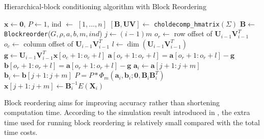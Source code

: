 \begin{algorithm}[!h]
    \caption{Hierarchical-block conditioning algorithm with Block Reordering}
    \begin{algorithmic}
            \State $\mathbf{x} \leftarrow \mathbf{0}$, $P \leftarrow 1$, ind $\leftarrow$ $[1,\dots, n]$
            \State $[\mathbf{B}, \mathbf{UV}] \leftarrow$ \texttt{choldecomp\_hmatrix}$(\Sigma)$
            \State $\mathbf{B} \leftarrow$ \texttt{Blockreorder}($G, \rho, a, b, m, ind$)
                \State $j \leftarrow (i-1)m$
                    \State $o_r \leftarrow$ row offset of $\mathbf{U}_{i-1}\mathbf{V}_{i-1}^T$
                    \State $o_c \leftarrow$ column offset of $\mathbf{U}_{i-1}\mathbf{V}_{i-1}^T$
                    \State $l \leftarrow \dim(\mathbf{U}_{i-1}\mathbf{V}_{i-1}^T)$
                    \State $\mathbf{g} \leftarrow \mathbf{U}_{i-1}\mathbf{V}_{i-1}^T\mathbf{x}[o_c+1:o_c+l]$
                    \State $\mathbf{a}[o_r+1:o_r+l] = \mathbf{a}[o_r+1:o_r+l] - \mathbf{g}$
                    \State $\mathbf{b}[o_r+1:o_r+l] = \mathbf{a}[o_r+1:o_r+l] - \mathbf{g}$
                \EndIf
                \State $\mathbf{a}_i \leftarrow \mathbf{a}[j+1:j+m]$
                \State $\mathbf{b}_i \leftarrow \mathbf{b}[j+1:j+m]$
                \State $P = P*\Phi_m(\mathbf{a}_i, \mathbf{b}_i; \mathbf{0}, \mathbf{B}_i\mathbf{B}_i^T)$
                \State $\mathbf{x}[j+1:j+m] \leftarrow \mathbf{B}_{i}^{-1} E(\mathbf{X}_i)$
            \EndFor
        \EndProcedure
    \end{algorithmic}\label{alg:hmvn_bro}
\end{algorithm}

Block reordering aims for improving accuracy rather than shortening computation time. According to the simulation result introduced in \citet{cao2019hierarchical}, the extra time used for running block reordering is relatively small compared with the total time costs. 



